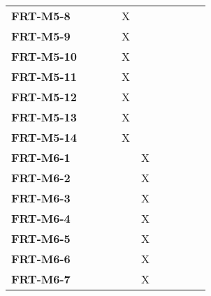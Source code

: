 \documentclass[12pt, titlepage]{article}
\begin{document}
\begin{longtable}{|l|ccccccc|}
	\textbf{FRT-M5-8}  & ~                                        & ~           & X           & ~           & ~           & ~           & ~           \\
	\textbf{FRT-M5-9}  & ~                                        & ~           & X           & ~           & ~           & ~           & ~           \\
	\textbf{FRT-M5-10} & ~                                        & ~           & X           & ~           & ~           & ~           & ~           \\
	\textbf{FRT-M5-11} & ~                                        & ~           & X           & ~           & ~           & ~           & ~           \\
	\textbf{FRT-M5-12} & ~                                        & ~           & X           & ~           & ~           & ~           & ~           \\
	\textbf{FRT-M5-13} & ~                                        & ~           & X           & ~           & ~           & ~           & ~           \\
	\textbf{FRT-M5-14} & ~                                        & ~           & X           & ~           & ~           & ~           & ~           \\
	\textbf{FRT-M6-1}  & ~                                        & ~           & ~           & X           & ~           & ~           & ~           \\
	\textbf{FRT-M6-2}  & ~                                        & ~           & ~           & X           & ~           & ~           & ~           \\
	\textbf{FRT-M6-3}  & ~                                        & ~           & ~           & X           & ~           & ~           & ~           \\
	\textbf{FRT-M6-4}  & ~                                        & ~           & ~           & X           & ~           & ~           & ~           \\
	\textbf{FRT-M6-5}  & ~                                        & ~           & ~           & X           & ~           & ~           & ~           \\
	\textbf{FRT-M6-6}  & ~                                        & ~           & ~           & X           & ~           & ~           & ~           \\
	\textbf{FRT-M6-7}  & ~                                        & ~           & ~           & X           & ~           & ~           & ~           \\

\end{longtable}
\end{document}
